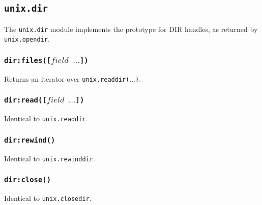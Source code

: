 \documentclass[11pt, oneside]{memoir}
\newcommand*{\fn}[1]{\texttt{#1}\xspace}
\newcommand*{\module}[1]{\texttt{#1}\xspace}
\newcounter{toccols}
\newenvironment{Module}[1]{
	\subsection{\texttt{#1}}
	\addtocontents{toc}{
		\protect\begin{multicols}{\value{toccols}}
	}
}{
	\addtocontents{toc}{\protect\end{multicols}}
}
\begin{document}
\begin{Module}{unix.dir}

The \module{unix.dir} module implements the prototype for DIR handles, as returned by \fn{unix.opendir}.

\subsubsection[\fn{dir:files}]{\fn{dir:files([$field$ $\ldots$])}}

Returns an iterator over \fn{unix.readdir($\ldots$)}.

\subsubsection[\fn{dir:read}]{\fn{dir:read([$field$ $\ldots$])}}

Identical to \fn{unix.readdir}.

\subsubsection[\fn{dir:rewind}]{\fn{dir:rewind()}}

Identical to \fn{unix.rewinddir}.

\subsubsection[\fn{dir:close}]{\fn{dir:close()}}

Identical to \fn{unix.closedir}.

\end{Module}

%
%
%
%
%
%
%
%
%


\appendix
\printindex
\end{document}

